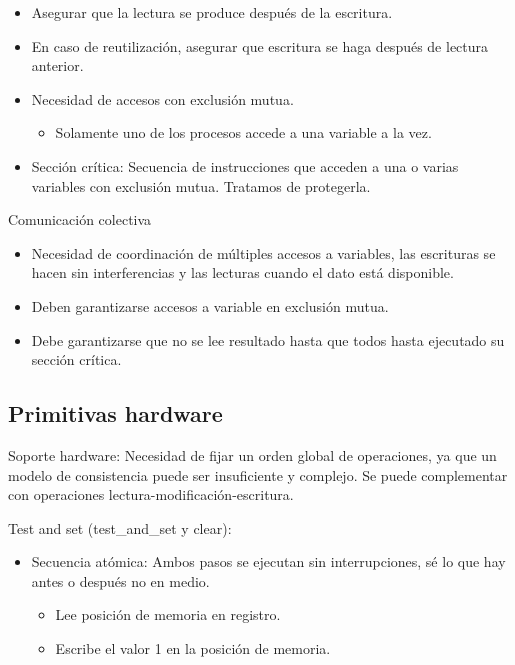 \documentclass[12pt, twoside, openright]{report} %
\begin{document}
    \begin{itemize}
    
    \item
      Asegurar que la lectura se produce después de la escritura.
    \item
      En caso de reutilización, asegurar que escritura se haga después
      de lectura anterior.
    \item
      Necesidad de accesos con exclusión mutua.

      \begin{itemize}
      
      \item
        Solamente uno de los procesos accede a una variable a la vez.
      \end{itemize}
    \item
      Sección crítica: Secuencia de instrucciones que acceden a una o
      varias variables con exclusión mutua. Tratamos de protegerla.
    \end{itemize}

    Comunicación colectiva

    \begin{itemize}
    
    \item
      Necesidad de coordinación de múltiples accesos a variables, las
      escrituras se hacen sin interferencias y las lecturas cuando el
      dato está disponible.
    \item
      Deben garantizarse accesos a variable en exclusión mutua.
    \item
      Debe garantizarse que no se lee resultado hasta que todos hasta
      ejecutado su sección crítica.
    \end{itemize}

\subsection{Primitivas hardware}



    Soporte hardware: Necesidad de fijar un orden global de
    operaciones, ya que un modelo de consistencia puede ser
    insuficiente y complejo. Se puede complementar con operaciones
    lectura-modificación-escritura.

    Test and set (test\_and\_set y clear):

    \begin{itemize}
    
    \item
      Secuencia atómica: Ambos pasos se ejecutan sin interrupciones,
      sé lo que hay antes o después no en medio.

      \begin{itemize}
      
      \item
        Lee posición de memoria en registro.
      \item
        Escribe el valor 1 en la posición de memoria.
      \end{itemize}
    \end{itemize}
\end{document}
